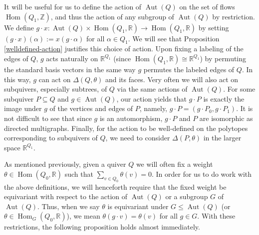 \documentclass[11pt]{amsart}
\theoremstyle{plain}
\theoremstyle{definition}
\newcommand{\R}{\mathbb{R}}
\newcommand{\Z}{\mathbb{Z}}
\DeclareMathOperator{\aut}{Aut}
\DeclareMathOperator{\Hom}{Hom}
\renewcommand{\hom}{\Hom}
\begin{document}
It will be useful for us to define the action of $\aut(Q)$ on the set of flows $\hom(Q_1, \Z)$, and thus the action of any subgroup of $\aut(Q)$ by restriction. We define $g \cdot x : \aut(Q) \times \hom(Q_1, \R) \to \hom(Q_1, \R)$ by setting $(g \cdot x)(\alpha) := x(g \cdot \alpha)$ for all $\alpha \in Q_1$. We will see that Proposition \ref{welldefined-action} justifies this choice of action. Upon fixing a labeling of the edges of $Q$, $g$ acts naturally on $\R^{Q_1}$ (since $\hom(Q_1, \R) \cong \R^{Q_1}$) by permuting the standard basis vectors in the same way $g$ permutes the labeled edges of $Q$. In this way, $g$ can act on $\Delta(Q, \theta)$ and its faces. Very often we will also act on subquivers, especially subtrees, of $Q$ via the same actions of $\aut(Q)$. For some subquiver $P \subseteq Q$ and $g \in \aut(Q)$, our action yields that $g \cdot P$ is exactly the image under $g$ of the vertices and edges of $P$, namely, $g \cdot P = (g \cdot P_0, g \cdot P_1)$. It is not difficult to see that since $g$ is an automorphism, $g \cdot P$ and $P$ are isomorphic as directed multigraphs. Finally, for the action to be well-defined on the polytopes corresponding to  subquivers of $Q$, we need to consider $\Delta(P, \theta)$ in the larger space $\R^{Q_1}$. 

As mentioned previously, given a quiver $Q$ we will often fix a weight $\theta \in \hom(Q_0, \R)$ such that $\sum_{v \in Q_0}\theta(v) = 0$. In order for us to do work with the above definitions, we will henceforth require that the fixed weight be equivariant with respect to the action of $\aut(Q)$ or a subgroup $G$ of $\aut(Q)$. Thus, when we say $\theta$ is equivariant under $G \leq \aut(Q)$ (or $\theta \in \hom_{G}(Q_0, \R)$), we mean $\theta(g \cdot v) = \theta(v)$ for all $g \in G$. With these restrictions, the following proposition holds almost immediately.
 
\end{document}
